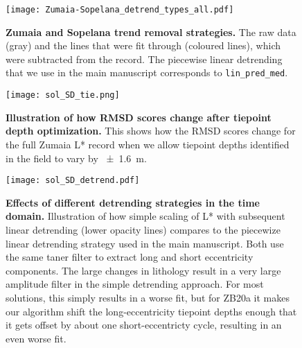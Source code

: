 \documentclass[draft]{agujournal2019}
\begin{document}
\begin{figure}[htbp]
  \centering
  \texttt{[image: Zumaia-Sopelana\_detrend\_types\_all.pdf]}
  \caption{\label{fig:detrend}
    \textbf{Zumaia and Sopelana trend removal strategies.}
    The raw data (gray) and the lines that were fit through (coloured lines), which were subtracted from the record.
    The piecewise linear detrending that we use in the main manuscript corresponds to \texttt{lin\_pred\_med}.
  }
\end{figure}

\begin{figure}[htb]
  \centering \texttt{[image: sol\_SD\_tie.png]}
  \caption{\label{fig:full-RMSD-tie}
    \textbf{Illustration of how RMSD scores change after tiepoint depth optimization.}
    This shows how the \gls{RMSD} scores change for the full
    Zumaia \gls{L*} record
    when we allow tiepoint depths identified in the field to vary by \qty{\pm1.6}{\metre}.
    }
\end{figure}



\begin{figure}[htb]
  \centering \texttt{[image: sol\_SD\_detrend.pdf]}
  \caption{\label{fig:Lstar-detrend}
  \textbf{Effects of different detrending strategies in the time domain.}
    Illustration of how simple scaling of \gls{L*} with subsequent linear detrending (lower opacity lines)
    compares to the piecewize linear detrending strategy used in the main manuscript.
    Both use the same taner filter to extract long and short eccentricity components.
    The large changes in lithology result in a very large amplitude filter in the simple detrending approach.
    For most solutions, this simply results in a worse fit, but for ZB20a it makes our algorithm shift the long-eccentricity tiepoint depths enough that it gets offset by about one short-eccentricty cycle, resulting in an even worse fit.
    }
\end{figure}
\end{document}
